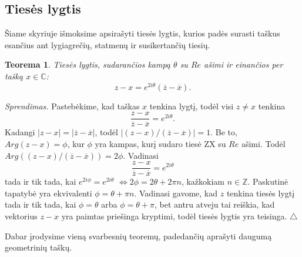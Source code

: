 \documentclass[11pt,a4paper,twoside]{book}
\newenvironment{sprendimas}{\noindent \textit{Sprendimas.}}{\hfill $\triangle$}
\newtheorem{thmnr}{Teorema}
\theoremstyle{definition} \newtheorem*{api}{Apibrėžimas}
\theoremstyle{remark} \newtheorem*{pastaba}{Pastaba}
\begin{document}
\subsection*{Tiesės lygtis}

Šiame skyriuje išmoksime apsirašyti tiesės lygtis, kurios padės surasti taškus esančius ant lygiagrečių, statmenų ir susikertančių tiesių.

\begin{thmnr}
Tiesės lygtis, sudarančios kampą $\theta$ su $Re$ ašimi ir einančios per tašką $x \in \mathbb{C}$: $$z-x=e^{2i\theta}(\overline{z}-\overline{x}).$$
\end{thmnr}
\begin{sprendimas}
Pastebėkime, kad taškas $x$ tenkina lygtį, todėl visi $ z \neq x$ tenkina $$\frac{z-x}{\overline{z}-\overline{x}}=e^{2i\theta}.$$ Kadangi $|z-x|=|\overline{z}-\overline{x}|$, todėl $|(z-x)/(\overline{z}-\overline{x})|=1$. Be to, $Arg (z-x) =\phi$, kur $\phi$ yra kampas, kurį sudaro tiesė ZX su $Re$ ašimi. Todėl $Arg ((z-x)/(\overline{z}-\overline{x})) =2\phi$. Vadinasi 
$$\frac{z-x}{\overline{z}-\overline{x}}=e^{2i\theta}$$ tada ir tik tada, kai $e^{2i\phi}=e^{2i\theta}$ $\Leftrightarrow 2\phi =2\theta + 2\pi n$, kažkokiam $n \in \mathbb{Z}.$ Paskutinė tapatybė yra ekvivalenti $\phi = \theta + \pi n$. Vadinasi gavome, kad $z$ tenkina tiesės lygtį tada ir tik tada, kai $\phi = \theta$ arba $\phi = \theta + \pi$, bet antru atveju tai reiškia, kad vektorius $z-x$ yra paimtas priešinga kryptimi, todėl tiesės lygtis yra teisinga.
\end{sprendimas}




\bigskip
Dabar įrodysime vieną svarbesnių teoremų, padedančių aprašyti daugumą geometrinių taškų.
\end{document}
